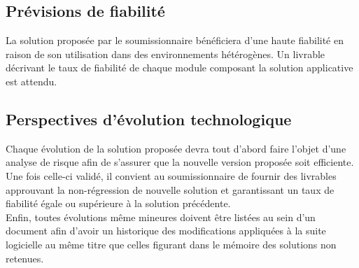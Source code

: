 \subsection{Prévisions de fiabilité}
La solution proposée par le soumissionnaire bénéficiera d'une haute fiabilité en raison de son utilisation dans des environnements hétérogènes. Un livrable décrivant le taux de fiabilité de chaque module composant la solution applicative est attendu.

\subsection{Perspectives d'évolution technologique}
Chaque évolution de la solution proposée devra tout d'abord faire l'objet d'une analyse de risque afin de s'assurer que la nouvelle version proposée soit efficiente.
\\
Une fois celle-ci validé, il convient au soumissionnaire de fournir des livrables approuvant la non-régression de nouvelle solution et garantissant un taux de fiabilité égale ou supérieure à la solution précédente.
\\
Enfin, toutes évolutions même mineures doivent être listées au sein d'un document afin d'avoir un historique des modifications appliquées à la suite logicielle au même titre que celles figurant dans le mémoire des solutions non retenues.
